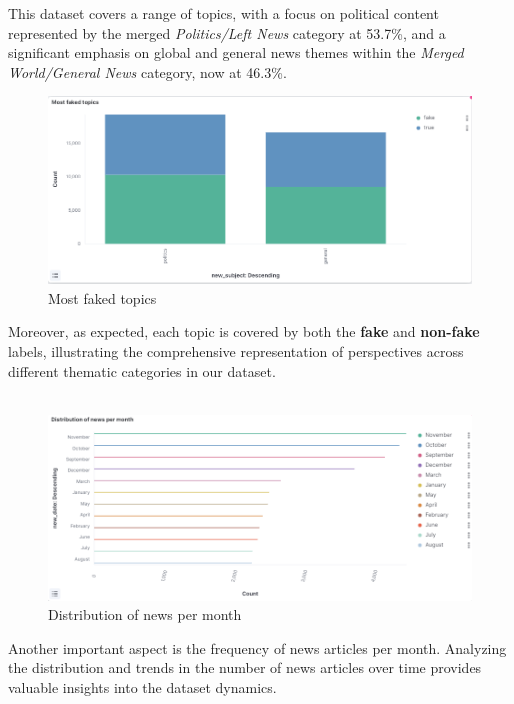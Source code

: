  This dataset covers a range of topics, with a focus on political content represented by the merged \textit{Politics/Left News} category at 53.7\%, and a significant emphasis on global and general news themes within the \textit{Merged World/General News} category, now at 46.3\%.

\newpage


\begin{figure}[h!]
  \centering
  \includegraphics[width=1.1\linewidth]{Images/kibana_4.png}
  \caption{Most faked topics}
  \label{fig:kibana_4}
\end{figure}

Moreover, as expected, each topic is covered by both the \textbf{fake} and \textbf{non-fake} labels, illustrating the comprehensive representation of perspectives across different thematic categories in our dataset.
\\
\\


\begin{figure}[h]
  \centering
  \includegraphics[width=1.0\linewidth]{Images/kibana_3.png}
  \caption{Distribution of news per month}
  \label{fig:kibana_4}
\end{figure}

Another important aspect is the frequency of news articles per month. Analyzing the distribution and trends in the number of news articles over time provides valuable insights into the dataset dynamics.


